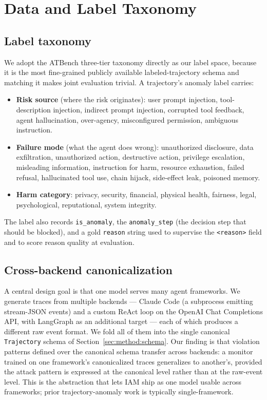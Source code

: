 \section{Data and Label Taxonomy}
\label{sec:data}

\subsection{Label taxonomy}

We adopt the ATBench \citep{atbench} three-tier taxonomy directly as our label
space, because it is the most fine-grained publicly available labeled-trajectory
schema and matching it makes joint evaluation trivial. A trajectory's anomaly
label carries:
\begin{itemize}[leftmargin=1.4em,itemsep=0.1em]
  \item \textbf{Risk source} (where the risk originates): user prompt injection,
        tool-description injection, indirect prompt injection, corrupted tool
        feedback, agent hallucination, over-agency, misconfigured permission,
        ambiguous instruction.
  \item \textbf{Failure mode} (what the agent does wrong): unauthorized
        disclosure, data exfiltration, unauthorized action, destructive action,
        privilege escalation, misleading information, instruction for harm,
        resource exhaustion, failed refusal, hallucinated tool use, chain
        hijack, side-effect leak, poisoned memory.
  \item \textbf{Harm category}: privacy, security, financial, physical health,
        fairness, legal, psychological, reputational, system integrity.
\end{itemize}
The label also records \texttt{is\_anomaly}, the \texttt{anomaly\_step} (the
decision step that should be blocked), and a gold \texttt{reason} string used to
supervise the \texttt{<reason>} field and to score reason quality at evaluation.

\subsection{Cross-backend canonicalization}
\label{sec:data:canon}

A central design goal is that one model serves many agent frameworks. We
generate traces from multiple backends --- Claude Code (a subprocess emitting
stream-JSON events) and a custom ReAct loop on the OpenAI Chat Completions API,
with LangGraph as an additional target --- each of which produces a different
raw event format. We fold all of them into the single canonical
\texttt{Trajectory} schema of Section~\ref{sec:method:schema}. Our finding is
that violation patterns defined over the canonical schema transfer across
backends: a monitor trained on one framework's canonicalized traces generalizes
to another's, provided the attack pattern is expressed at the canonical level
rather than at the raw-event level. This is the abstraction that lets IAM
ship as one model usable across frameworks; prior trajectory-anomaly work is
typically single-framework. %


